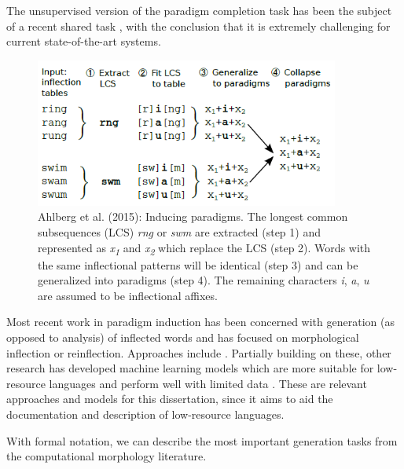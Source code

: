 The unsupervised version of the paradigm completion task \citep{jin2020unsupervised} has been the subject of a recent shared task \citep{kann2020sigmorphon}, with the conclusion that it is extremely challenging for current state-of-the-art systems. 

\begin{figure}[tb]
\begin{center}
\includegraphics[width=10cm]{figs/Ahlberg2015-LCS.PNG}
\caption[Ahlberg et al. (2015)]{Ahlberg et al. (2015): Inducing paradigms. The longest common subsequences (LCS) \textit{rng} or \textit{swm} are extracted (step 1) and represented as \textit{x\textsubscript{1}} and \textit{x\textsubscript{2}} which replace the LCS (step 2). Words with the same inflectional patterns will be identical (step 3) and can be generalized into paradigms (step 4). The remaining characters \textit{i}, \textit{a}, \textit{u} are assumed to be inflectional affixes.}
\label{fig:LCS}
\end{center}
\end{figure}


Most recent work in paradigm induction has been concerned with generation (as opposed to analysis) of inflected words and has focused on morphological inflection or reinflection. Approaches include \citet{durrett-denero-2013-supervised,nicolai-etal-2015-inflection,faruqui-etal-2016-morphological,kann-schutze-2016-single,aharoni-goldberg-2017-morphological}. Partially building on these, other research has developed machine learning models which are more suitable for low-resource languages and perform well with limited data \citep{kann-etal-2017-one,sharma-etal-2018-iit,makarov-clematide-2018-imitation,wu-cotterell-2019-exact,kann2020learning,wu2020applying}. These are relevant approaches and models for this dissertation, since it aims to aid the documentation and description of low-resource languages. 

With formal notation, we can describe the most important generation tasks from the computational morphology literature. 

